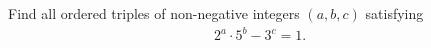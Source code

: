 
Find all ordered triples of non-negative integers $(a, b, c)$ satisfying 
\begin{align*}
2^{a} \cdot 5^{b} - 3^{c} = 1.
\end{align*}
